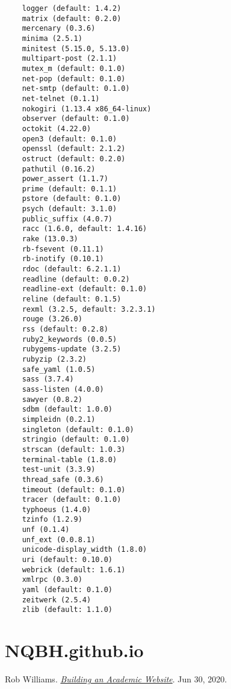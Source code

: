 \documentclass{article}
\numberwithin{equation}{section}
\begin{document}
\begin{verbatim}
	logger (default: 1.4.2)
	matrix (default: 0.2.0)
	mercenary (0.3.6)
	minima (2.5.1)
	minitest (5.15.0, 5.13.0)
	multipart-post (2.1.1)
	mutex_m (default: 0.1.0)
	net-pop (default: 0.1.0)
	net-smtp (default: 0.1.0)
	net-telnet (0.1.1)
	nokogiri (1.13.4 x86_64-linux)
	observer (default: 0.1.0)
	octokit (4.22.0)
	open3 (default: 0.1.0)
	openssl (default: 2.1.2)
	ostruct (default: 0.2.0)
	pathutil (0.16.2)
	power_assert (1.1.7)
	prime (default: 0.1.1)
	pstore (default: 0.1.0)
	psych (default: 3.1.0)
	public_suffix (4.0.7)
	racc (1.6.0, default: 1.4.16)
	rake (13.0.3)
	rb-fsevent (0.11.1)
	rb-inotify (0.10.1)
	rdoc (default: 6.2.1.1)
	readline (default: 0.0.2)
	readline-ext (default: 0.1.0)
	reline (default: 0.1.5)
	rexml (3.2.5, default: 3.2.3.1)
	rouge (3.26.0)
	rss (default: 0.2.8)
	ruby2_keywords (0.0.5)
	rubygems-update (3.2.5)
	rubyzip (2.3.2)
	safe_yaml (1.0.5)
	sass (3.7.4)
	sass-listen (4.0.0)
	sawyer (0.8.2)
	sdbm (default: 1.0.0)
	simpleidn (0.2.1)
	singleton (default: 0.1.0)
	stringio (default: 0.1.0)
	strscan (default: 1.0.3)
	terminal-table (1.8.0)
	test-unit (3.3.9)
	thread_safe (0.3.6)
	timeout (default: 0.1.0)
	tracer (default: 0.1.0)
	typhoeus (1.4.0)
	tzinfo (1.2.9)
	unf (0.1.4)
	unf_ext (0.0.8.1)
	unicode-display_width (1.8.0)
	uri (default: 0.10.0)
	webrick (default: 1.6.1)
	xmlrpc (0.3.0)
	yaml (default: 0.1.0)
	zeitwerk (2.5.4)
	zlib (default: 1.1.0)
\end{verbatim}

\section{NQBH.github.io}


\begin{thebibliography}{99}
	 Rob Williams. \href{https://jayrobwilliams.com/posts/2020/06/academic-website/}{\textit{Building an Academic Website}}. Jun 30, 2020.
\end{thebibliography}


\printbibliography[heading=bibintoc]
	
\end{document}
